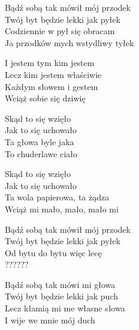 \begin{text}
    Bądź sobą tak mówił mój przodek\\
    Twój byt będzie lekki jak pyłek\\
    Codziennie w pył się obracam\\
    Ja przodków mych wstydliwy tyłek

    \vin I jestem tym kim jestem\\
    \vin Lecz kim jestem właściwie\\
    \vin Każdym słowem i gestem\\
    \vin Wciąż sobie się dziwię

    \vin Skąd to się wzięło\\
    \vin Jak to się uchowało\\
    \vin Ta głowa byle jaka\\
    \vin To chuderlawe ciało

    \vin Skąd to się wzięło\\
    \vin Jak to się uchowało\\
    \vin Ta wola papierowa, ta żądza\\
    \vin Wciąż mi mało, mało, mało mi

    Bądź sobą tak mówił mój przodek\\
    Twój byt będzie lekki jak pyłek\\
    Od bytu do bytu więc lecę\\
    ??????

    Bądź sobą tak mówi mi głowa\\
    Twój byt będzie lekki jak puch\\
    Lecz kłamią mi me własne słowa\\
    I wije we mnie mój duch
\end{text}
\begin{chord}

\end{chord}